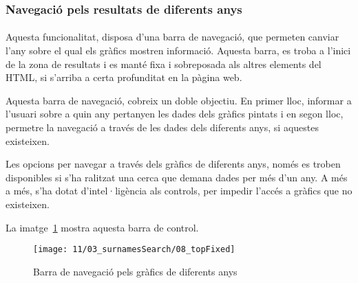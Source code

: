 \subsubsection{Navegació pels resultats de diferents anys}

\paragraph{}
Aquesta funcionalitat, disposa d’una barra de navegació, que permeten canviar l’any sobre el qual els gràfics mostren informació. Aquesta barra, es troba a l’inici de la zona de resultats i es manté fixa i sobreposada als altres elements del HTML, si s’arriba a certa profunditat en la pàgina web.

Aquesta barra de navegació, cobreix un doble objectiu. En primer lloc, informar a l'usuari sobre a quin any pertanyen les dades dels gràfics pintats i en segon lloc, permetre la navegació a través de les dades dels diferents anys, si aquestes existeixen.

Les opcions per navegar a través dels gràfics de diferents anys, només es troben disponibles si s'ha ralitzat una cerca que demana dades per més d'un any. A més a més, s'ha dotat d'intel·ligència als controls, per impedir l'accés a gràfics que no existeixen.

La imatge~\ref{fig:topFixed} mostra aquesta barra de control.

\begin{figure}[h]
    \texttt{[image: 11/03\_surnamesSearch/08\_topFixed]}
    \centering
    \caption{Barra de navegació pels gràfics de diferents anys}\label{fig:topFixed}
\end{figure}
